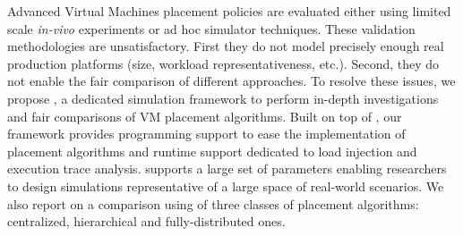 

Advanced Virtual Machines placement policies are evaluated either
using limited scale \emph{in-vivo} experiments or ad hoc simulator
techniques. These validation methodologies are unsatisfactory. First
they do not model precisely enough real production platforms (size,
workload representativeness, etc.). Second, they do not enable the
fair comparison of different approaches. To resolve these issues, we
propose \vmps, a dedicated simulation framework to perform in-depth
investigations and fair comparisons of VM placement algorithms. Built
on top of \sg,
our framework provides programming support to ease the implementation
of placement algorithms and runtime support dedicated to load
injection and execution trace analysis.  \vmps supports a large set of
parameters enabling researchers to design simulations representative
of a large space of real-world scenarios.
We also report on a comparison using \vmps of three classes of
placement algorithms: centralized, hierarchical and fully-distributed
ones.



